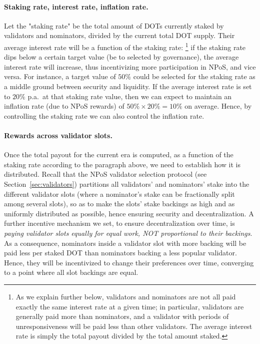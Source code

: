 \paragraph{Staking rate, interest rate, inflation rate.} Let the "staking rate" be the total amount of DOTs 
currently staked by validators and nominators, divided by the current total DOT supply. 
Their average interest rate will be a function of the staking rate:%
\footnote{As we explain further below, validators and nominators are not all paid exactly the same 
interest rate at a given time; in particular, validators are generally paid more than nominators, 
and a validator with periods of unresponsiveness will be paid less than other validators. 
The average interest rate is simply the total payout divided by the total amount staked.}
if the staking rate dips below a certain target value (be to selected by governance), 
the average interest rate will increase, thus incentivizing more participation in NPoS, and vice versa. 
For instance, a target value of $50\%$ could be selected for the staking rate as a middle ground between security 
and liquidity. If the average interest rate is set to $20\%$ p.a.~at that staking rate value, 
then we can expect to maintain an inflation rate (due to NPoS rewards) of $50\%\times 20\% = 10\%$ on average. 
Hence, by controlling the staking rate we can also control the inflation rate. 


\paragraph{Rewards across validator slots.} Once the total payout for the current era is computed, 
as a function of the staking rate according to the paragraph above, we need to establish how it is distributed.
Recall that the NPoS validator selection protocol (see Section~\ref{sec:validators}) 
partitions all validators' and nominators' stake into the different validator slots 
(where a nominator's stake can be fractionally split among several slots), so as to make the slots' 
stake backings as high and as uniformly distributed as possible, hence ensuring security and decentralization. 
A further incentive mechanism we set, to ensure decentralization over time, 
is \emph{paying validator slots equally for equal work, NOT proportional to their backings}. 
As a consequence, nominators inside a validator slot with more backing will be paid less per staked DOT 
than nominators backing a less popular validator. Hence, they will be incentivized to change 
their preferences over time, converging to a point where all slot backings are equal.

